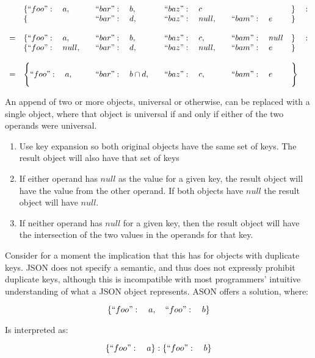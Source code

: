 \documentclass[letterpaper]{article}
\begin{document}
\begin{prule}
\begin{equation}
\begin{array}{rlllll}
& \{``foo":\quad a,\quad&``bar":\quad b,\quad&``baz":\quad c&&\}\quad:\\
& \{&``bar":\quad d,\quad&``baz":\quad null,\quad&``bam":\quad e&\} \\
\\
=&\{``foo":\quad a,\quad&``bar":\quad b,\quad&``baz":\quad c,\quad&``bam":\quad null&\}\quad:\\
 &\{``foo":\quad null,\quad&``bar":\quad d,\quad&``baz":\quad null,\quad&``bam":\quad e&\} \\
\\
=&\Bigg\{``foo":\quad a,\quad&``bar":\quad b\cap
d,\quad&``baz":\quad c,\quad&``bam":\quad e&\Bigg\}\\
\end{array}
\end{equation}

An append of two or more objects, universal or otherwise, can be replaced with
a single object, where that object is universal if and only if either of the
two operands were universal.
\begin{enumerate}
\item Use key expansion so both original objects have the same set of keys. The
result object will also have that set of keys
\item If either operand has \(null\) as the value for a given key, the result
object will have the value from the other operand. If both objects have
\(null\) the result object will have \(null\).
\item If neither operand has \(null\) for a given key, then the result object
will have the intersection of the two values in the operands for that key.
\end{enumerate}
\end{prule}

Consider for a moment the implication that this has for objects with duplicate
keys. JSON does not specify a semantic, and thus does not expressly prohibit
duplicate keys, although this is incompatible with most programmers' intuitive
understanding of what a JSON object represents. ASON offers a solution, where:

\begin{equation}
\{``foo":\quad a,\quad``foo":\quad b\}
\end{equation}

Is interpreted as:

\begin{equation}
\{``foo":\quad a\}:\{``foo":\quad b\}
\end{equation}
\end{document}
